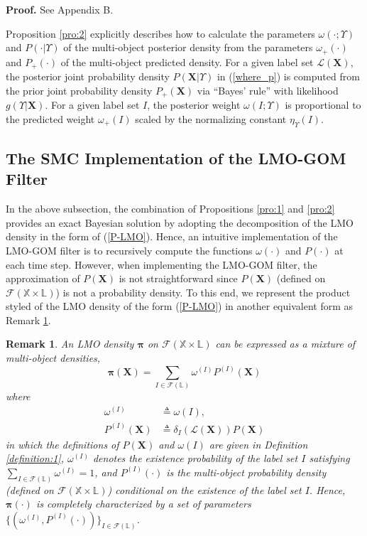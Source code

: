 \documentclass[journal]{IEEEtran}
\newcommand{\bX}{{\mathbf X}}
\newcommand{\bpi}{{\boldsymbol\pi}}
\newtheorem{Rem}{Remark}
\newcommand{\proproof}[1]{\noindent\textbf{Proof. } See Appendix #1.}
\begin{document}
{\proproof{B}

Proposition \ref{pro:2} explicitly describes how to calculate the parameters $\omega(\cdot;\Upsilon)$ and $P(\cdot|\Upsilon)$  of the  multi-object posterior density from the parameters $\omega_+(\cdot)$ and $P_+(\cdot)$ of the multi-object  predicted   density. For a given label set $\mathcal{L}(\bX)$, the posterior joint probability density $P(\bX|\Upsilon)$ in (\ref{where_p}) is computed from the prior joint probability density $P_+(\bX)$    via ``Bayes' rule'' with likelihood $g(\Upsilon|\bX)$. For a given label set $I$, the posterior weight $\omega(I;\Upsilon)$ is  proportional to the predicted weight $\omega_+(I)$  scaled by the normalizing constant $\eta_\Upsilon(I)$.


 \subsection{The SMC Implementation of the LMO-GOM Filter}
In the above subsection, the combination of Propositions \ref{pro:1} and \ref{pro:2} provides an exact Bayesian solution  by adopting the decomposition of  the LMO  density  in the form of (\ref{P-LMO}). Hence, an intuitive  implementation of the LMO-GOM filter is to recursively compute the functions $\omega(\cdot)$ and $P(\cdot)$ at each time step. However, when implementing the LMO-GOM filter,   the  approximation of   $P(\mathbf{X})$  is not straightforward since  $P(\mathbf{X})$ (defined on $\mathcal{F}(\mathbb{X}\times\mathbb{L})$) is not a probability density.  To this end, we  represent the product styled of the LMO density of the form (\ref{P-LMO}) in another equivalent form  as  Remark \ref{mixture-LMO}.
\begin{Rem}\label{mixture-LMO}
An LMO density $\bpi$  on $\mathcal{F}(\mathbb{X}\times\mathbb{L})$ can be expressed as a mixture of multi-object densities, 
\begin{equation}\label{delta-LMO}
\bpi(\bX)={\sum}_{I\in\mathcal{F}(\mathbb{L})} \omega^{(I)}P^{(I)}(\bX)
\end{equation}
where
\begin{align}
\omega^{(I)}&\triangleq\omega(I),\\
P^{(I)}(\bX)&\triangleq\delta_{I}(\mathcal{L}(\bX))P(\bX)
\end{align}
in which the definitions of $P(\bX)$ and $\omega(I)$ are given in Definition \ref{definition:1}, 
$\omega^{(I)}$ denotes the  existence probability of the label set $I$ satisfying $\sum_{I\in\mathcal{F}(\mathbb{L})}\omega^{(I)}=1$, and  $P^{(I)}(\cdot)$ is the multi-object probability density (defined on $\mathcal{F}(\mathbb{X}\times\mathbb{L})$) conditional on the existence of the label set  $I$. Hence, $\bpi(\cdot)$ is completely characterized by a set of parameters $\{(\omega^{(I)}, P^{(I)}(\cdot))\}_{I\in\mathcal{F}(\mathbb{L})}$.
\end{Rem}



}
\end{document}
